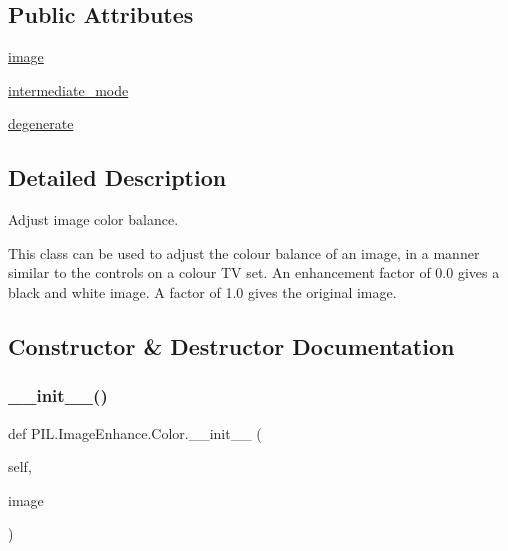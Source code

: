\subsection*{Public Attributes}
\begin{DoxyCompactItemize}
\item 
\hyperlink{classPIL_1_1ImageEnhance_1_1Color_a95b65184dce9fc1456b374deaa073a1c}{image}
\item 
\hyperlink{classPIL_1_1ImageEnhance_1_1Color_addb631f96c57e593955cbce126252f8c}{intermediate\+\_\+mode}
\item 
\hyperlink{classPIL_1_1ImageEnhance_1_1Color_a6cb8158013bd192fc97118a248ddb16c}{degenerate}
\end{DoxyCompactItemize}


\subsection{Detailed Description}
\begin{DoxyVerb}Adjust image color balance.

This class can be used to adjust the colour balance of an image, in
a manner similar to the controls on a colour TV set. An enhancement
factor of 0.0 gives a black and white image. A factor of 1.0 gives
the original image.
\end{DoxyVerb}
 

\subsection{Constructor \& Destructor Documentation}
\mbox{\label{classPIL_1_1ImageEnhance_1_1Color_a896761666eeffac39aa5c83dba4a68bd}} 
\subsubsection{\texorpdfstring{\+\_\+\+\_\+init\+\_\+\+\_\+()}{\_\_init\_\_()}}
{\footnotesize\ttfamily def P\+I\+L.\+Image\+Enhance.\+Color.\+\_\+\+\_\+init\+\_\+\+\_\+ (\begin{DoxyParamCaption}\item[{}]{self,  }\item[{}]{image }\end{DoxyParamCaption})}



